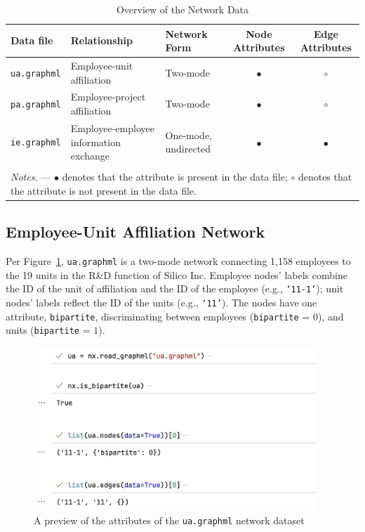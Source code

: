 \documentclass[11pt]{article}
\begin{document}
\begin{table}
	\begin{small}
		\caption{Overview of the Network Data}
		\label{tab:network_data}
		\begin{center}
			\begin{tabular}[c]{l|l|l|c|c}
                        \textbf{Data file} 
			& \textbf{Relationship} 
			& \textbf{Network Form} 
			& \textbf{Node Attributes}
			& \textbf{Edge Attributes}\\
			\hline
			\texttt{ua.graphml}
			& Employee-unit affiliation 
			& Two-mode
			& $\bullet$
			& $\circ$ \\
			\texttt{pa.graphml}
			& Employee-project affiliation
			& Two-mode
			& $\bullet$
			& $\circ$ \\
			\texttt{ie.graphml}
			& Employee-employee information exchange
			& One-mode, undirected
			& $\bullet$
			& $\bullet$ \\
			\hline \\[-1.8ex]
			\multicolumn{5}{l}{\small \textit{Notes.} --- $\bullet$ denotes that the attribute is 
			present in the data file; $\circ$ denotes that the attribute is not
			present in the data file.}
			\end{tabular}
		\end{center}
	\end{small}
\end{table}
\clearpage

\subsection{Employee-Unit Affiliation Network}

Per Figure~\ref{fig:ua}, \texttt{ua.graphml} is a two-mode network connecting
1,158 employees to the 19 units in the R\&D function of Silico Inc. Employee
nodes' labels combine the ID of the unit of affiliation and the ID of the
employee (e.g., \texttt{`11-1'}); unit nodes' labels reflect the ID of the units
(e.g., \texttt{`11'}).  The nodes have one attribute, \texttt{bipartite}, 
discriminating between employees (\texttt{bipartite} = $0$), and units 
(\texttt{bipartite} = $1$).

\begin{figure}
	\centering
	\includegraphics[width=0.95\textwidth]{ua.png}
	\caption{A preview of the attributes of the  
	\texttt{ua.graphml} network dataset}
	\label{fig:ua}
\end{figure}
\end{document}

